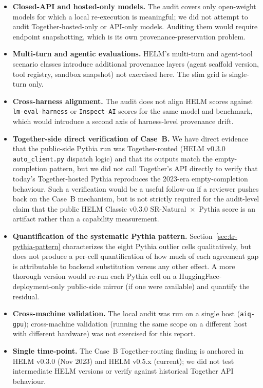 \documentclass[11pt]{article}
\begin{document}
\begin{itemize}
  \item \textbf{Closed-API and hosted-only models.}
        The audit covers only open-weight models for which a local
        re-execution is meaningful; we did not attempt to audit
        Together-hosted-only or API-only models.
        Auditing them would require endpoint snapshotting, which is
        its own provenance-preservation problem.
  \item \textbf{Multi-turn and agentic evaluations.}
        HELM's multi-turn and agent-tool scenario classes introduce
        additional provenance layers (agent scaffold version, tool
        registry, sandbox snapshot) not exercised here.
        The slim grid is single-turn only.
  \item \textbf{Cross-harness alignment.}
        The audit does not align HELM scores against
        \texttt{lm-eval-harness} or \texttt{Inspect-AI} scores for
        the same model and benchmark, which would introduce a second
        axis of harness-level provenance drift.
  \item \textbf{Together-side direct verification of Case~B.}
        We have direct evidence that the public-side Pythia run was
        Together-routed (HELM v0.3.0 \texttt{auto\_client.py}
        dispatch logic) and that its outputs match the
        empty-completion pattern, but we did not call Together's API
        directly to verify that today's Together-hosted Pythia
        reproduces the 2023-era empty-completion behaviour.
        Such a verification would be a useful follow-on if a reviewer
        pushes back on the Case~B mechanism, but is not strictly
        required for the audit-level claim that the public HELM
        Classic v0.3.0 SR-Natural~$\times$~Pythia score is an
        artifact rather than a capability measurement.
  \item \textbf{Quantification of the systematic Pythia pattern.}
        Section~\ref{sec:tr-pythia-pattern} characterizes the eight
        Pythia outlier cells qualitatively, but does not produce a
        per-cell quantification of how much of each agreement gap is
        attributable to backend substitution versus any other
        effect.
        A more thorough version would re-run each Pythia cell on a
        HuggingFace-deployment-only public-side mirror (if one were
        available) and quantify the residual.
  \item \textbf{Cross-machine validation.}
        The local audit was run on a single host (\texttt{aiq-gpu});
        cross-machine validation (running the same scope on a
        different host with different hardware) was not exercised
        for this report.
  \item \textbf{Single time-point.}
        The Case~B Together-routing finding is anchored in HELM v0.3.0
        (Nov 2023) and HELM v0.5.x (current); we did not test
        intermediate HELM versions or verify against historical
        Together API behaviour.
\end{itemize}
\end{document}
